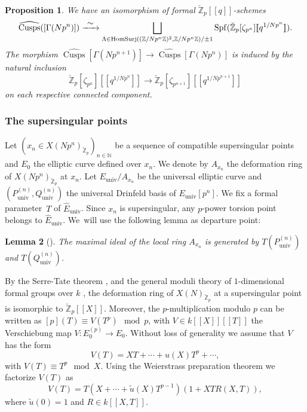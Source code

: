\documentclass[JEP,XML,SOM,Unicode,published]{cedram}
\newcommand\To[1]{\mathchoice{\xrightarrow{\textstyle\kern4pt#1\kern3pt}}{\stackrel{#1}{\to}}{}{}}
\newcommand{\lcr}{[\![}
\newcommand{\rcr}{]\!]}
\newcommand{\univ}{\mathrm{univ}}
\numberwithin{equation}{section}
\newtheorem{prop}{Proposition}[section]
\newtheorem{lem}[prop]{Lemma}
\theoremstyle{definition}
\newcommand{\bb}[1]{\mathbb{#1}}
\DeclareMathOperator{\Spf}{Spf}
\DeclareMathOperator{\Cusps}{Cusps}
\DeclareMathOperator{\HomSurj}{HomSurj}
\newcommand{\mc}[1]{X(Np^{#1})}
\begin{document}
\begin{prop}
\label{Theorem structure cusps 2}
We have an isomorphism of formal $\breve{\bb{Z}}_p\lcr q\rcr$-schemes
\begin{equation*}
\widehat{\Cusps}(\left[\Gamma(Np^n)\right]) \To{\sim} \displaystyle\bigsqcup_{\Lambda\in \HomSurj((\bb{Z}/Np^n\bb{Z})^2,\bb{Z}/Np^n\bb{Z})/\pm 1} \Spf (\breve{\bb{Z}}_p[\zeta_{p^n}]\lcr q^{1/Np^n}\rcr).
\end{equation*}
The morphism $\widehat{\Cusps}[\Gamma(Np^{n+1})]\to \widehat{\Cusps}[\Gamma(Np^n)]$ is induced by the natural inclusion
\[
\breve{\bb{Z}}_p[\zeta_{p^n}]\lcr q^{1/Np^{n}}\rcr\to \breve{\bb{Z}}_p[\zeta_{p^{n+1}}]\lcr q^{1/Np^{n+1}}\rcr
\]
on each respective connected component.
\end{prop}

\subsubsection*{The supersingular points}

Let $(x_n\in \mc{n}_{\breve{\bb{Z}}_p})_{n\in \bb{N}}$ be a sequence of compatible supersingular points and $E_0$ the elliptic curve defined over $x_n$. We denote by $A_{x_n}$ the deformation ring of $X(Np^n)_{\breve{\bb{Z}}_p}$ at $x_n$. Let $E_{\univ}/A_{x_n}$ be the universal elliptic curve and $(P^{(n)}_{\univ},Q^{(n)}_{\univ})$ the universal Drinfeld basis of $E_{\univ}[p^n]$. We fix a formal parameter~$T$ of $\widehat{E}_{\univ}$. Since $x_n$ is supersingular, any $p$-power torsion point belongs to $\widehat{E}_{\univ}$. We~will use the following lemma as departure point:

\begin{lem}[{\cite[Th.\,5.3.2]{katz1985arithmetic}}]
\label{Lemma generators max ideal}
The maximal ideal of the local ring $A_{x_n}$ is generated by $T(P^{(n)}_{\univ})$ and $T(Q^{(n)}_{\univ})$.
\end{lem}

By the Serre-Tate theorem \cite[Th.\,1.2.1]{katz1981serre}, and the general moduli theory of $1$-dimensional formal groups over $k$ \cite{MR238854}, the deformation ring of $X(N)_{\breve{\bb{Z}}_p}$ at a supersingular point is isomorphic to $\breve{\bb{Z}}_p\lcr X\rcr$. Moreover, the $p$-multiplication modulo $p$ can be written as $[p](T)\equiv V(T^p) \mod p$, with $V\in k\lcr X\rcr\lcr T\rcr$ the Verschiebung map $V: E_0^{(p)}\to E_0$. Without loss of generality we assume that $V$ has the form
\[
V(T)= XT+\cdots+ u(X)T^p+\cdots,
\]
with $V(T)\equiv T^p \mod X$. Using the Weierstrass preparation theorem we factorize $V(T)$ as
\begin{equation}
\label{verschpowerseries}
V(T)=T(X+\cdots +\tilde{u}(X)T^{p-1})(1+XT R(X,T)),
\end{equation}
where $\tilde{u}(0)=1$ and $R\in k\lcr X,T\rcr$.
\end{document}
